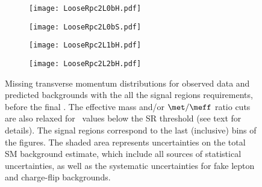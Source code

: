 \begin{figure}[p!]
\centering
 \begin{subfigure}{0.42\textwidth}
 \texttt{[image: LooseRpc2L0bH.pdf]}
 \end{subfigure}
 \begin{subfigure}{0.42\textwidth}
 \texttt{[image: LooseRpc2L0bS.pdf]}
 \end{subfigure}
  \begin{subfigure}{0.42\textwidth}
 \texttt{[image: LooseRpc2L1bH.pdf]}
 \end{subfigure}
  \begin{subfigure}{0.42\textwidth}
 \texttt{[image: LooseRpc2L2bH.pdf]}
 \end{subfigure}
   \caption{
Missing transverse momentum distributions for observed data and predicted backgrounds 
with the all the signal regions requirements, before the final \met. 
The effective mass and/or $\met/\meff$ ratio cuts are also relaxed for \met\ values below the SR threshold (see text for details). 
The signal regions correspond to the last (inclusive) bins of the figures. 
The shaded area represents uncertainties on the total SM background estimate, 
which include all sources of statistical uncertainties, 
as well as the systematic uncertainties for fake lepton and charge-flip backgrounds. 
}
\label{fig:results_datamc_rpc}
\end{figure}


